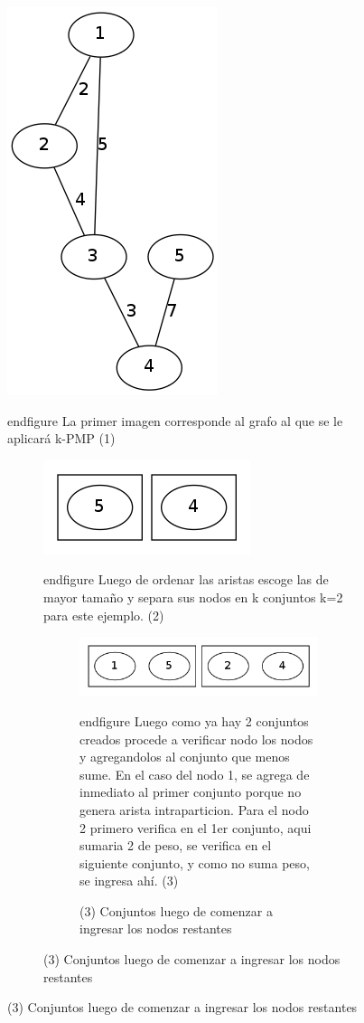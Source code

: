 \begin{figure}[H]
\begin{center}
\includegraphics[scale=0.4]{./img/greedy1.png}
\caption{(1) Grafo de ejemplo}
\end{center}
end{figure}
La primer imagen corresponde al grafo al que se le aplicará k-PMP (1)

\begin{figure}[H]
\begin{center}
\includegraphics[scale=0.4]{./img/greedy2.png}
\caption{(2) Conjuntos 1 y 2 luego de separar los nodos de las aristas mas pesadas}
\end{center}
end{figure}
Luego de ordenar las aristas escoge las de mayor tamaño y separa sus nodos en k conjuntos k=2 para este ejemplo. (2)

\begin{figure}[H]
\begin{center}
\includegraphics[scale=0.4]{./img/greedy3.png}
\caption{(3) Conjuntos luego de comenzar a ingresar los nodos restantes}
\end{center}
end{figure}
Luego como ya hay 2 conjuntos creados procede a verificar nodo los nodos y agregandolos al conjunto que menos sume. En el caso del nodo 1, se agrega de inmediato al primer conjunto porque no genera arista intraparticion. Para el nodo 2 primero verifica en el 1er conjunto, aqui sumaria 2 de peso, se verifica en el siguiente conjunto, y como no suma peso, se ingresa ahí. (3)


\end{figure}
\end{figure}
\end{figure}
